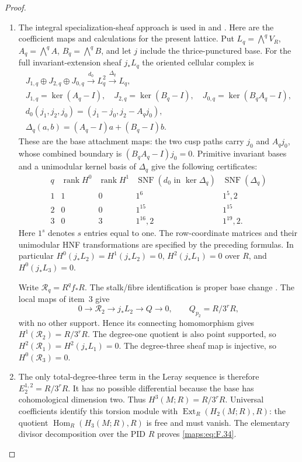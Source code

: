 \begin{proof}
\begin{enumerate}[label={$\langle1\rangle$\arabic*.}]
\item The integral specialization-sheaf approach is used in
\cite[Lemma 7.25 and Propositions 7.26--7.27, pp.~61--63]{AC26}
and \cite[section ``The integral homology'']{E26}.
Here are the coefficient maps and calculations for the present lattice.  Put $L_q=\bigwedge^qV_R$, $A_q=\bigwedge^qA$,
$B_q=\bigwedge^qB$, and let $j$ include the thrice-punctured base.
For the full invariant-extension sheaf $j_*L_q$ the oriented
cellular complex is
\[
\begin{gathered}
 J_{1,q}\oplus J_{2,q}\oplus J_{0,q}
 \xrightarrow{d_0}L_q^2\xrightarrow{\Delta_q}L_q,\\
 J_{1,q}=\ker(A_q-I),\quad J_{2,q}=\ker(B_q-I),\quad
 J_{0,q}=\ker(B_qA_q-I),\\
 d_0(j_1,j_2,j_0)=(j_1-j_0,j_2-A_qj_0),\\
 \Delta_q(a,b)=(A_q-I)a+(B_q-I)b.
\end{gathered}
\]
These are the base attachment maps: the two cusp paths
carry $j_0$ and $A_qj_0$, whose combined boundary is
$(B_qA_q-I)j_0=0$.  Primitive invariant bases and a unimodular
kernel basis of $\Delta_q$ give the following certificates:
\[
\begin{array}{c|c|c|c|c}
q&\operatorname{rank}H^0&\operatorname{rank}H^1&
 \operatorname{SNF}(d_0\text{ in }\ker\Delta_q)&
 \operatorname{SNF}(\Delta_q)\\\hline
1&1&0&1^6&1^5,2\\
2&0&0&1^{15}&1^{15}\\
3&0&3&1^{16},2&1^{19},2.
\end{array}
\]
Here $1^s$ denotes $s$ entries equal to one.  The row-coordinate
matrices and their unimodular HNF transformations are specified by the preceding formulas.
In particular $H^0(j_*L_2)=H^1(j_*L_2)=0$,
$H^2(j_*L_1)=0$ over $R$, and $H^0(j_*L_3)=0$.

Write $\mathcal R_q=R^qf_*R$.  The stalk/fibre
identification is proper base change
\cite[Tag 09V5, Lemma 20.18.1]{StacksProject}.
The local maps of item~3 give
\[
 0\longrightarrow\mathcal R_2\longrightarrow j_*L_2
 \longrightarrow Q\longrightarrow0,
 \qquad Q_{p_2}=R/3^rR,
\]
with no other support.  Hence its connecting homomorphism gives
$H^1(\mathcal R_2)=R/3^rR$.
The degree-one quotient is also point supported, so
$H^2(\mathcal R_1)=H^2(j_*L_1)=0$.
The degree-three sheaf map is injective, so
$H^0(\mathcal R_3)=0$.

\item The only total-degree-three term in the Leray sequence
\cite[Tag 01F2, Lemma 20.13.4]{StacksProject} is therefore
$E_2^{1,2}=R/3^rR$.  It has no possible differential because
the base has cohomological dimension two.  Thus
$H^3(M;R)=R/3^rR$.
Universal coefficients
\cite[Theorem 3.2, p.~195]{Hatcher2002} identify this torsion
module with $\operatorname{Ext}_R(H_2(M;R),R)$: the quotient
$\operatorname{Hom}_R(H_3(M;R),R)$ is free and must vanish.
The elementary divisor decomposition over the PID $R$ proves
\eqref{maps:eq:F.34}.


\end{enumerate}
\end{proof}

